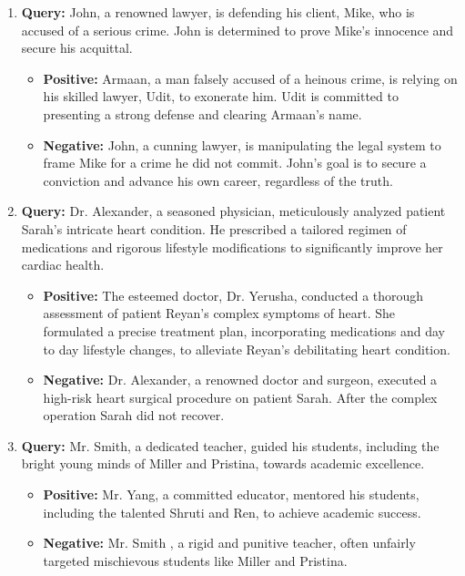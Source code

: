 \begin{enumerate}
    \item \textbf{Query:}  John, a renowned lawyer, is defending his client, Mike, who is accused of a serious crime. John is determined to prove Mike's innocence and secure his acquittal.
        \begin{itemize}
            \item \textbf{Positive:} Armaan, a man falsely accused of a heinous crime, is relying on his skilled lawyer, Udit, to exonerate him. Udit is committed to presenting a strong defense and clearing Armaan's name.
            \item \textbf{Negative:} John, a cunning lawyer, is manipulating the legal system to frame Mike for a crime he did not commit. John's goal is to secure a conviction and advance his own career, regardless of the truth.
        \end{itemize}



    \item \textbf{Query:}  Dr. Alexander, a seasoned physician, meticulously analyzed patient Sarah’s intricate heart condition. He prescribed a tailored regimen of  medications and rigorous lifestyle modifications to significantly improve her cardiac health.
        \begin{itemize}
            \item \textbf{Positive:} The esteemed doctor, Dr. Yerusha, conducted a thorough assessment of patient Reyan’s complex symptoms of heart. She formulated a precise treatment plan, incorporating  medications and day to day lifestyle changes, to alleviate Reyan's debilitating heart condition.
            \item \textbf{Negative:} Dr. Alexander, a renowned doctor and surgeon, executed a high-risk heart surgical procedure on patient Sarah. After the complex operation Sarah did not recover.
        \end{itemize}



    \item \textbf{Query:}  Mr. Smith, a dedicated teacher, guided his students, including the bright young minds of Miller and Pristina, towards academic excellence.
        \begin{itemize}
            \item \textbf{Positive:} Mr. Yang, a committed educator, mentored his students, including the talented Shruti and Ren, to achieve academic success.
            \item \textbf{Negative:} Mr. Smith , a rigid and punitive teacher, often unfairly targeted mischievous students like Miller and Pristina.
        \end{itemize}



\end{enumerate}
